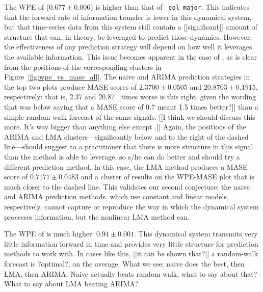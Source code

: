 The WPE of \svdfive ($0.677 \pm 0.006$) is higher than that of {\tt
  col\_major}.  This indicates that the forward rate of information
transfer is lower in this dynamical system, but that time-series data
from this system still contain a {\color{red} [[significant]]} amount
of structure that can, in theory, be leveraged to predict those
dynamics.  However, the effectiveness of any prediction strategy will
depend on how well it leverages the available information.
% 
% 
This issue becomes apparent in the case of \svdfive, as is clear from
the positions of the corresponding clusters in
Figure~\ref{fig:wpe_vs_mase_all}.  The naive and ARIMA prediction
strategies in the top two plots produce MASE scores of $2.3700 \pm
0.0505 $ and $20.8703 \pm 0.1915$, respectively: that is, 2.37 and
20.87 {\color{red} [[times worse is this right, given the wording that
      was below saying that a MASE score of 0.7 meant 1.5 times
      better?]]}  than a simple random walk forecast of the same
signals.  {\color{red} [[I think we should discuss this more.  It's
      way bigger than anything else except \svdthree.]]}  Again, the
positions of the ARIMA and LMA clusters---significantly below and to
the right of the dashed line---should suggest to a practitioner that
there is more structure in this signal than the method is able to
leverage, so s/he can do better and should try a different prediction
method.  In this case, the LMA method produces a MASE score of $
0.7177\pm 0.0483 $ and a cluster of results on the WPE-MASE plot that
is much closer to the dashed line.  This validates our second
conjecture: the naive and ARIMA prediction methods, which use constant
and linear models, respectively, cannot capture or reproduce the way
in which the \svdfive dynamical system processes information, but the
nonlinear LMA method can.

The WPE of \gcc is much higher: $0.94 \pm 0.001$.  This dynamical
system transmits very little information forward in time and provides
very little structure for prediction methods to work with.  In cases
like this, {\color{red} [[it can be shown that?]] a random-walk
  forecast is ?optimal?, on the average.  What we see: naive does the
  best, then LMA, then ARIMA.  Naive actually beats random walk; what
  to say about that?  What to say about LMA beating ARIMA?}

